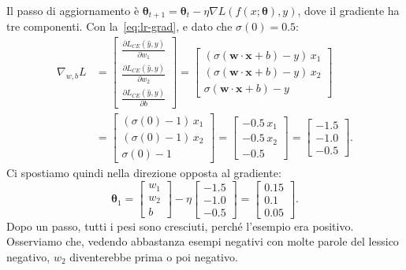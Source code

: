 Il passo di aggiornamento è $\boldsymbol{\theta}_{t+1} = \boldsymbol{\theta}_t - \eta \nabla L(f(x; \boldsymbol{\theta}), y)$, dove il gradiente ha tre componenti. Con la~\eqref{eq:lr-grad}, e dato che $\sigma(0) = 0.5$:
\[
\begin{aligned}
\nabla_{w, b} L &= \begin{bmatrix} \frac{\partial L_{CE}(\hat{y}, y)}{\partial w_1} \\[3pt] \frac{\partial L_{CE}(\hat{y}, y)}{\partial w_2} \\[3pt] \frac{\partial L_{CE}(\hat{y}, y)}{\partial b} \end{bmatrix}
= \begin{bmatrix} (\sigma(\mathbf{w} \cdot \mathbf{x} + b) - y)\, x_1 \\ (\sigma(\mathbf{w} \cdot \mathbf{x} + b) - y)\, x_2 \\ \sigma(\mathbf{w} \cdot \mathbf{x} + b) - y \end{bmatrix}
\\
&= \begin{bmatrix} (\sigma(0) - 1)\, x_1 \\ (\sigma(0) - 1)\, x_2 \\ \sigma(0) - 1 \end{bmatrix}
= \begin{bmatrix} -0.5\, x_1 \\ -0.5\, x_2 \\ -0.5 \end{bmatrix}
= \begin{bmatrix} -1.5 \\ -1.0 \\ -0.5 \end{bmatrix}.
\end{aligned}
\]
Ci spostiamo quindi nella direzione opposta al gradiente:
\[
\boldsymbol{\theta}_1 = \begin{bmatrix} w_1 \\ w_2 \\ b \end{bmatrix} - \eta \begin{bmatrix} -1.5 \\ -1.0 \\ -0.5 \end{bmatrix} = \begin{bmatrix} 0.15 \\ 0.1 \\ 0.05 \end{bmatrix}.
\]
Dopo un passo, tutti i pesi sono cresciuti, perché l'esempio era positivo. Osserviamo che, vedendo abbastanza esempi negativi con molte parole del lessico negativo, $w_2$ diventerebbe prima o poi negativo.

